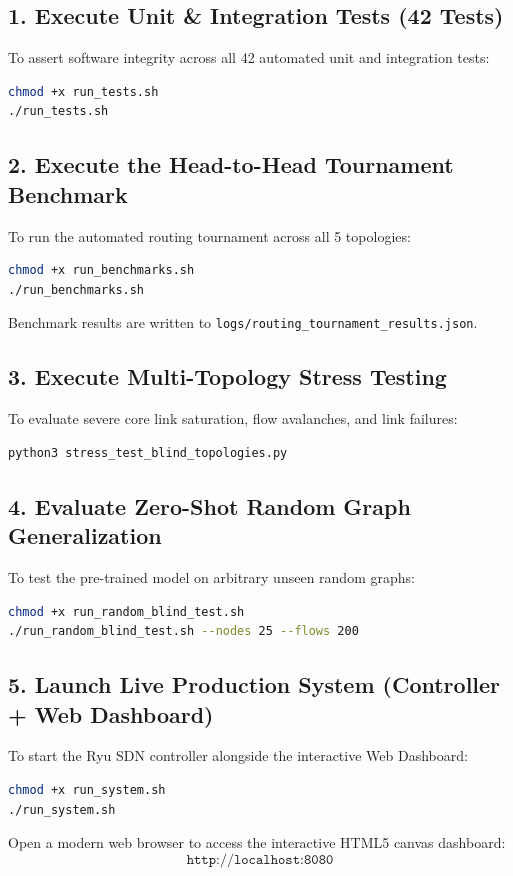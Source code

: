 \documentclass[12pt,a4paper,oneside]{report}
\begin{document}
\subsection{1. Execute Unit \& Integration Tests (42 Tests)}
To assert software integrity across all 42 automated unit and integration tests:
\begin{lstlisting}[language=bash]
chmod +x run_tests.sh
./run_tests.sh
\end{lstlisting}

\subsection{2. Execute the Head-to-Head Tournament Benchmark}
To run the automated routing tournament across all 5 topologies:
\begin{lstlisting}[language=bash]
chmod +x run_benchmarks.sh
./run_benchmarks.sh
\end{lstlisting}
Benchmark results are written to \texttt{logs/routing\_tournament\_results.json}.

\subsection{3. Execute Multi-Topology Stress Testing}
To evaluate severe core link saturation, flow avalanches, and link failures:
\begin{lstlisting}[language=bash]
python3 stress_test_blind_topologies.py
\end{lstlisting}

\subsection{4. Evaluate Zero-Shot Random Graph Generalization}
To test the pre-trained model on arbitrary unseen random graphs:
\begin{lstlisting}[language=bash]
chmod +x run_random_blind_test.sh
./run_random_blind_test.sh --nodes 25 --flows 200
\end{lstlisting}

\subsection{5. Launch Live Production System (Controller + Web Dashboard)}
To start the Ryu SDN controller alongside the interactive Web Dashboard:
\begin{lstlisting}[language=bash]
chmod +x run_system.sh
./run_system.sh
\end{lstlisting}
Open a modern web browser to access the interactive HTML5 canvas dashboard:
\begin{equation*}
    \texttt{http://localhost:8080}
\end{equation*}
\end{document}
